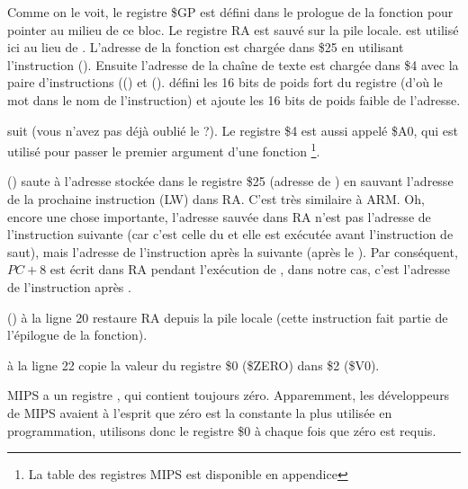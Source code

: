 

Comme on le voit, le registre \$GP est défini dans le prologue de la fonction
pour pointer au milieu de ce bloc.
Le registre \ac{RA} est sauvé sur la pile locale.
\puts est utilisé ici au lieu de \printf.
L'adresse de la fonction \puts est chargée dans \$25 en utilisant l'instruction  ().
Ensuite l'adresse de la chaîne de texte est chargée dans \$4 avec la paire
d'instructions  (() et 
().
 défini les 16 bits de poids fort du registre (d'où le mot 
dans le nom de l'instruction) et  ajoute les 16 bits de poids faible
de l'adresse.

 suit  (vous n'avez pas déjà oublié le  ?).
Le registre \$4 est aussi appelé \$A0, qui est utilisé pour passer le premier
argument d'une fonction \footnote{La table des registres MIPS est disponible en
appendice }.


 () saute à l'adresse stockée dans le registre
\$25 (adresse de \puts) en sauvant l'adresse de la prochaine instruction (LW)
dans \ac{RA}.
C'est très similaire à ARM.
Oh, encore une chose importante, l'adresse sauvée dans \ac{RA} n'est pas
l'adresse de l'instruction suivante (car c'est celle du  et
elle est exécutée avant l'instruction de saut), mais l'adresse de l'instruction
après la suivante (après le ).
Par conséquent, $PC + 8$ est écrit dans \ac{RA} pendant l'exécution de ,
dans notre cas, c'est l'adresse de l'instruction  après .

 () à la ligne 20 restaure \ac{RA} depuis la pile locale
(cette instruction fait partie de l'épilogue de la fonction).


 à la ligne 22 copie la valeur du registre \$0 (\$ZERO) dans \$2 (\$V0).
\label{MIPS_zero_register}

MIPS a un registre , qui contient toujours zéro.
Apparemment, les développeurs de MIPS avaient à l'esprit que zéro est la constante
la plus utilisée en programmation, utilisons donc le registre \$0 à chaque fois
que zéro est requis.


